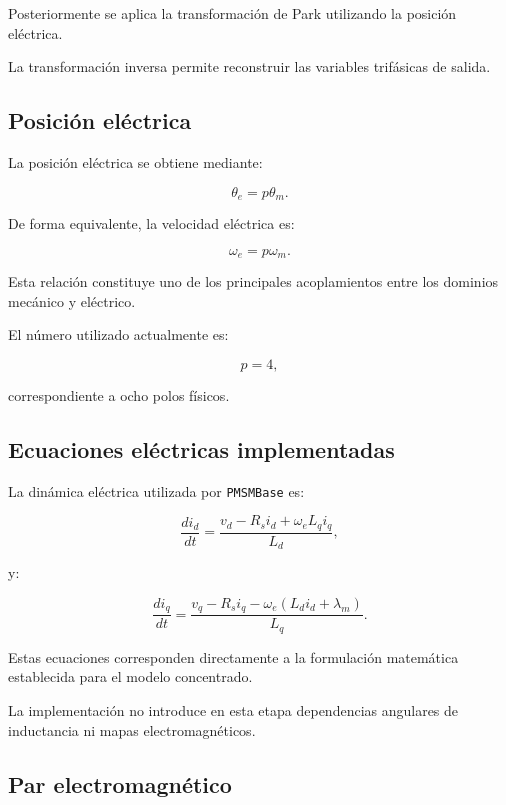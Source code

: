 Posteriormente se aplica la transformación de Park utilizando la posición eléctrica.

La transformación inversa permite reconstruir las variables trifásicas de salida.

\subsection{Posición eléctrica}

La posición eléctrica se obtiene mediante:

\begin{equation}
\theta_e=p\theta_m.
\end{equation}

De forma equivalente, la velocidad eléctrica es:

\begin{equation}
\omega_e=p\omega_m.
\end{equation}

Esta relación constituye uno de los principales acoplamientos entre los dominios mecánico y eléctrico.

El número utilizado actualmente es:

\begin{equation}
p=4,
\end{equation}

correspondiente a ocho polos físicos.

\subsection{Ecuaciones eléctricas implementadas}

La dinámica eléctrica utilizada por \texttt{PMSMBase} es:

\begin{equation}
\frac{di_d}{dt}
=
\frac{
v_d-R_si_d+\omega_eL_qi_q
}
{L_d},
\end{equation}

y:

\begin{equation}
\frac{di_q}{dt}
=
\frac{
v_q-R_si_q-\omega_e(L_di_d+\lambda_m)
}
{L_q}.
\end{equation}

Estas ecuaciones corresponden directamente a la formulación matemática establecida para el modelo concentrado.

La implementación no introduce en esta etapa dependencias angulares de inductancia ni mapas electromagnéticos.

\subsection{Par electromagnético}

